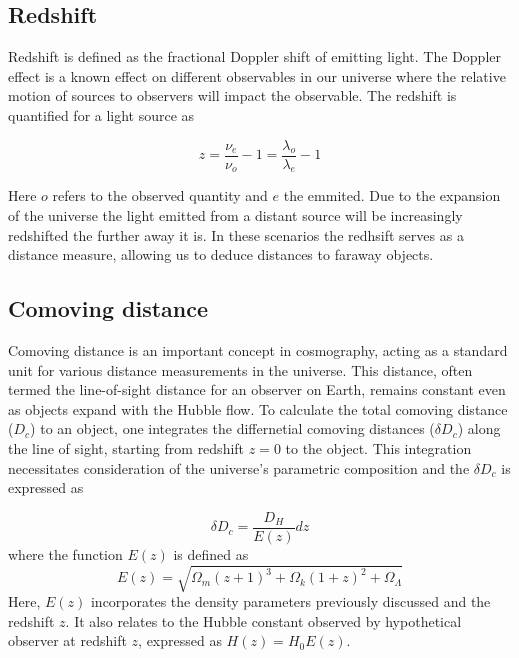 \documentclass{article}
\begin{document}
\subsection{Redshift}
Redshift is defined as the fractional Doppler shift of emitting light. The Doppler effect is a known effect on different observables in our universe where the relative motion of sources to observers will impact the observable. The redshift is quantified for a light source as 

\begin{equation}
    z = \frac{\nu_e}{\nu_o}-1 = \frac{\lambda_o}{\lambda_e}-1
\end{equation}

Here $o$ refers to the observed quantity and $e$ the emmited. Due to the expansion of the universe the light emitted from a distant source will be increasingly redshifted the further away it is.
In these scenarios the redhsift serves as a distance measure, allowing  us to deduce distances to faraway objects.



\subsection{Comoving distance}
\label{sec:comoving_distance}


Comoving distance is an important concept in cosmography, 
acting as a standard unit for various distance measurements in the universe. 
This distance, often termed the line-of-sight distance for an observer on Earth, 
remains constant even as objects expand with the Hubble flow. 
To calculate the total comoving distance ($D_c$) to an object, 
one integrates the differnetial comoving distances ($\delta D_c$) along the line of sight, starting from redshift 
$z=0$ to the object. This integration necessitates consideration of the universe's parametric composition and the $\delta D_c$ is expressed as

\begin{equation}
    \delta D_c = \frac{D_H}{E(z)}dz
\end{equation}
where the function $E(z)$ is defined as
\begin{equation}
    E(z)  = \sqrt{\Omega_m(z+1)^3 +\Omega_k (1+z)^2 + \Omega_\Lambda  }
\end{equation}
Here, 
$E(z)$ incorporates the density parameters previously discussed and the redshift 
$z$. It also relates to the Hubble constant observed by hypothetical observer at redshift $z$, expressed as 
$H(z) = H_0 E(z)$.
\end{document}

